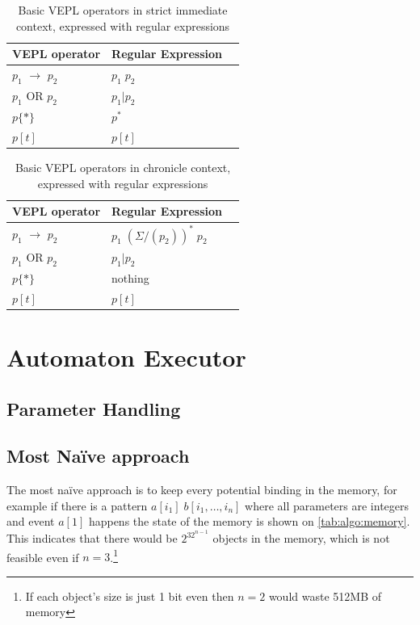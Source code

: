 \begin{table}
	\caption{Basic VEPL operators in strict immediate context, expressed with regular expressions}		
	\label{tab:cep:vepl_regex_strict}
	\centering
	\begin{tabularx}{0.5\textwidth}{llX}
		\toprule
		VEPL operator             &	Regular Expression \\
		\midrule
		$p_1$ $\rightarrow$ $p_2$ & $p_1\; p_2$ \\
		$p_1$ OR $p_2$            & $p_1|p_2$ \\
		$p\{\ast\}$               & $p^*$ \\
		$p[t]$                    & $p[t]$ \\ 
		\bottomrule
	\end{tabularx}
\end{table}

\begin{table}
	\caption{Basic VEPL operators in chronicle context, expressed with regular expressions}		
	\label{tab:cep:vepl_regex_chronicle}
	\centering
	\begin{tabularx}{0.5\textwidth}{llX}
		\toprule
		VEPL operator             &	Regular Expression \\
		\midrule
		$p_1$ $\rightarrow$ $p_2$ & $p_1 \; (\Sigma/(p_2))^* \; p_2$ \\
		$p_1$ OR $p_2$            & $p_1|p_2$ \\
		$p\{\ast\}$               & nothing\\
		$p[t]$                    & $p[t]$ \\
		\bottomrule
	\end{tabularx}
\end{table}

\section{Automaton Executor}

	\subsection{Parameter Handling}
	\label{section:algo:paramhandling}

	\subsection{Most Na\"ive approach}
	
	The most na\"ive approach is to keep every potential binding in the memory, for example if there is a pattern $a[i_1]\;b[i_1,\dots,i_n]$ where all parameters are integers and event $a[1]$ happens the state of the memory is shown on \cref{tab:algo:memory}. This indicates that there would be $2^{32^{n-1}}$ objects in the memory, which is not feasible even if $n=3$.\footnote{If each object's size is just 1 bit even then $n=2$ would waste 512MB of memory}
	
